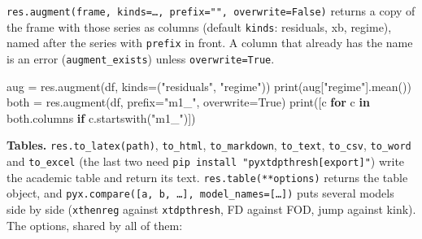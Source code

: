 \documentclass[
  10.5pt,
  a4paper,
]{article}
\newenvironment{Shaded}{}{}
\newcommand{\BuiltInTok}[1]{\textcolor[rgb]{0.00,0.50,0.00}{#1}}
\newcommand{\ControlFlowTok}[1]{\textcolor[rgb]{0.00,0.44,0.13}{\textbf{#1}}}
\newcommand{\KeywordTok}[1]{\textcolor[rgb]{0.00,0.44,0.13}{\textbf{#1}}}
\newcommand{\NormalTok}[1]{#1}
\newcommand{\OperatorTok}[1]{\textcolor[rgb]{0.40,0.40,0.40}{#1}}
\newcommand{\StringTok}[1]{\textcolor[rgb]{0.25,0.44,0.63}{#1}}
\newcommand{\VariableTok}[1]{\textcolor[rgb]{0.10,0.09,0.49}{#1}}
\begin{document}
\texttt{res.augment(frame,\ kinds=…,\ prefix="",\ overwrite=False)}
returns a copy of the frame with those series as columns (default
\texttt{kinds}: residuals, xb, regime), named after the series with
\texttt{prefix} in front. A column that already has the name is an error
(\texttt{augment\_exists}) unless \texttt{overwrite=True}.

\begin{Shaded}
\begin{Highlighting}[]
\NormalTok{aug }\OperatorTok{=}\NormalTok{ res.augment(df, kinds}\OperatorTok{=}\NormalTok{(}\StringTok{"residuals"}\NormalTok{, }\StringTok{"regime"}\NormalTok{))}
\BuiltInTok{print}\NormalTok{(aug[}\StringTok{"regime"}\NormalTok{].mean())}
\NormalTok{both }\OperatorTok{=}\NormalTok{ res.augment(df, prefix}\OperatorTok{=}\StringTok{"m1\_"}\NormalTok{, overwrite}\OperatorTok{=}\VariableTok{True}\NormalTok{)}
\BuiltInTok{print}\NormalTok{([c }\ControlFlowTok{for}\NormalTok{ c }\KeywordTok{in}\NormalTok{ both.columns }\ControlFlowTok{if}\NormalTok{ c.startswith(}\StringTok{"m1\_"}\NormalTok{)])}
\end{Highlighting}
\end{Shaded}

\textbf{Tables.} \texttt{res.to\_latex(path)}, \texttt{to\_html},
\texttt{to\_markdown}, \texttt{to\_text}, \texttt{to\_csv},
\texttt{to\_word} and \texttt{to\_excel} (the last two need
\texttt{pip\ install\ "pyxtdpthresh{[}export{]}"}) write the academic
table and return its text. \texttt{res.table(**options)} returns the
table object, and
\texttt{pyx.compare({[}a,\ b,\ …{]},\ model\_names={[}…{]})} puts
several models side by side (\texttt{xthenreg} against
\texttt{xtdpthresh}, FD against FOD, jump against kink). The options,
shared by all of them:
\end{document}

